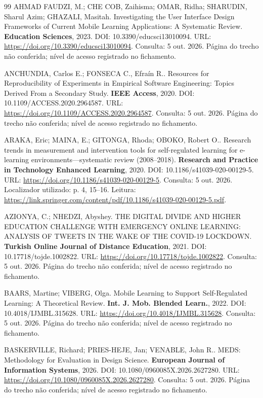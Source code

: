 \begin{thebibliography}{99}
 AHMAD FAUDZI, M.; CHE COB, Zaihisma; OMAR, Ridha; SHARUDIN, Sharul Azim; GHAZALI, Masitah. Investigating the User Interface Design Frameworks of Current Mobile Learning Applications: A Systematic Review. \textbf{Education Sciences}, 2023. DOI: 10.3390/educsci13010094. URL: \url{https://doi.org/10.3390/educsci13010094}. Consulta: 5 out. 2026. Página do trecho não conferida; nível de acesso registrado no fichamento.


 ANCHUNDIA, Carlos E.; FONSECA C., Efraín R.. Resources for Reproducibility of Experiments in Empirical Software Engineering: Topics Derived From a Secondary Study. \textbf{IEEE Access}, 2020. DOI: 10.1109/ACCESS.2020.2964587. URL: \url{https://doi.org/10.1109/ACCESS.2020.2964587}. Consulta: 5 out. 2026. Página do trecho não conferida; nível de acesso registrado no fichamento.


 ARAKA, Eric; MAINA, E.; GITONGA, Rhoda; OBOKO, Robert O.. Research trends in measurement and intervention tools for self-regulated learning for e-learning environments—systematic review (2008–2018). \textbf{Research and Practice in Technology Enhanced Learning}, 2020. DOI: 10.1186/s41039-020-00129-5. URL: \url{https://doi.org/10.1186/s41039-020-00129-5}. Consulta: 5 out. 2026. Localizador utilizado: p. 4, 15–16. Leitura: \url{https://link.springer.com/content/pdf/10.1186/s41039-020-00129-5.pdf}.


 AZIONYA, C.; NHEDZI, Abyshey. THE DIGITAL DIVIDE AND HIGHER EDUCATION CHALLENGE WITH EMERGENCY ONLINE LEARNING: ANALYSIS OF TWEETS IN THE WAKE OF THE COVID-19 LOCKDOWN. \textbf{Turkish Online Journal of Distance Education}, 2021. DOI: 10.17718/tojde.1002822. URL: \url{https://doi.org/10.17718/tojde.1002822}. Consulta: 5 out. 2026. Página do trecho não conferida; nível de acesso registrado no fichamento.


 BAARS, Martine; VIBERG, Olga. Mobile Learning to Support Self-Regulated Learning: A Theoretical Review. \textbf{Int. J. Mob. Blended Learn.}, 2022. DOI: 10.4018/IJMBL.315628. URL: \url{https://doi.org/10.4018/IJMBL.315628}. Consulta: 5 out. 2026. Página do trecho não conferida; nível de acesso registrado no fichamento.


 BASKERVILLE, Richard; PRIES-HEJE, Jan; VENABLE, John R.. MEDS: Methodology for Evaluation in Design Science. \textbf{European Journal of Information Systems}, 2026. DOI: 10.1080/0960085X.2026.2627280. URL: \url{https://doi.org/10.1080/0960085X.2026.2627280}. Consulta: 5 out. 2026. Página do trecho não conferida; nível de acesso registrado no fichamento.



\end{thebibliography}
